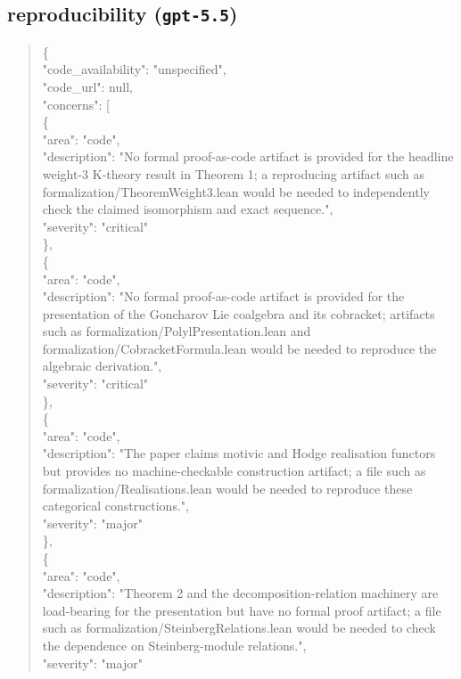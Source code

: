 \documentclass[11pt]{article}
\begin{document}
\subsection*{reproducibility (\texttt{gpt-5.5})}
\begin{quote}\small\ttfamily\raggedright
\{\\
  "code\_availability": "unspecified",\\
  "code\_url": null,\\
  "concerns": [\\
    \{\\
      "area": "code",\\
      "description": "No formal proof-as-code artifact is provided for the headline weight-3 K-theory result in Theorem 1; a reproducing artifact such as formalization/TheoremWeight3.lean would be needed to independently check the claimed isomorphism and exact sequence.",\\
      "severity": "critical"\\
    \},\\
    \{\\
      "area": "code",\\
      "description": "No formal proof-as-code artifact is provided for the presentation of the Goncharov Lie coalgebra and its cobracket; artifacts such as formalization/PolylPresentation.lean and formalization/CobracketFormula.lean would be needed to reproduce the algebraic derivation.",\\
      "severity": "critical"\\
    \},\\
    \{\\
      "area": "code",\\
      "description": "The paper claims motivic and Hodge realisation functors but provides no machine-checkable construction artifact; a file such as formalization/Realisations.lean would be needed to reproduce these categorical constructions.",\\
      "severity": "major"\\
    \},\\
    \{\\
      "area": "code",\\
      "description": "Theorem 2 and the decomposition-relation machinery are load-bearing for the presentation but have no formal proof artifact; a file such as formalization/SteinbergRelations.lean would be needed to check the dependence on Steinberg-module relations.",\\
      "severity": "major"\\

\end{quote}
\end{document}
